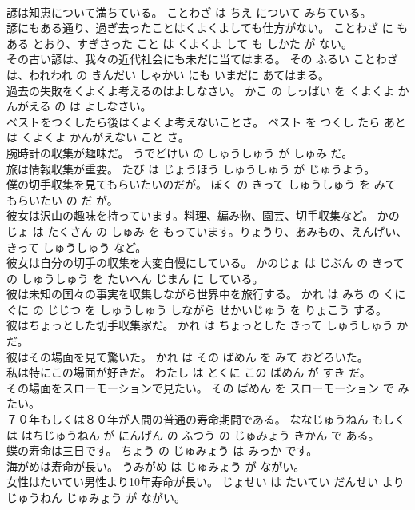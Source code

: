\documentclass[8pt]{extreport}
\begin{document}
\begin{CJK}{UTF8}{min}
\\	諺は知恵について満ちている。	ことわざ は ちえ について みちている。	
\\	諺にもある通り、過ぎ去ったことはくよくよしても仕方がない。	ことわざ に も ある とおり、すぎさった こと は くよくよ して も しかた が ない。	
\\	その古い諺は、我々の近代社会にも未だに当てはまる。	その ふるい ことわざ は、われわれ の きんだい しゃかい にも いまだに あてはまる。	
\\	過去の失敗をくよくよ考えるのはよしなさい。	かこ の しっぱい を くよくよ かんがえる の は よしなさい。	
\\	ベストをつくしたら後はくよくよ考えないことさ。	ベスト を つくし たら あと は くよくよ かんがえない こと さ。	
\\	腕時計の収集が趣味だ。	うでどけい の しゅうしゅう が しゅみ だ。	
\\	旅は情報収集が重要。	たび は じょうほう しゅうしゅう が じゅうよう。	
\\	僕の切手収集を見てもらいたいのだが。	ぼく の きって しゅうしゅう を みて もらいたい の だ が。	
\\	彼女は沢山の趣味を持っています。料理、編み物、園芸、切手収集など。	かのじょ は たくさん の しゅみ を もっています。りょうり、あみもの、えんげい、きって しゅうしゅう など。	
\\	彼女は自分の切手の収集を大変自慢にしている。	かのじょ は じぶん の きって の しゅうしゅう を たいへん じまん に している。	
\\	彼は未知の国々の事実を収集しながら世界中を旅行する。	かれ は みち の くにぐに の じじつ を しゅうしゅう しながら せかいじゅう を りょこう する。	
\\	彼はちょっとした切手収集家だ。	かれ は ちょっとした きって しゅうしゅう か だ。	
\\	彼はその場面を見て驚いた。	かれ は その ばめん を みて おどろいた。	
\\	私は特にこの場面が好きだ。	わたし は とくに この ばめん が すき だ。	
\\	その場面をスローモーションで見たい。	その ばめん を スローモーション で みたい。	
\\	７０年もしくは８０年が人間の普通の寿命期間である。	ななじゅうねん もしくは はちじゅうねん が にんげん の ふつう の じゅみょう きかん で ある。	
\\	蝶の寿命は三日です。	ちょう の じゅみょう は みっか です。	
\\	海がめは寿命が長い。	うみがめ は じゅみょう が ながい。	
\\	女性はたいてい男性より10年寿命が長い。	じょせい は たいてい だんせい より じゅうねん じゅみょう が ながい。	

\end{CJK}
\end{document}
